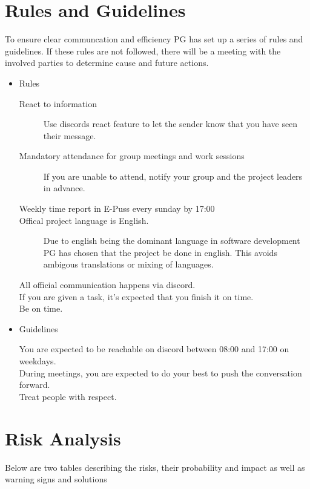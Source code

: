 \documentclass{article}
\begin{document}
\newpage
\section{Rules and Guidelines} %
    To ensure clear communcation and efficiency PG has set up a series of rules and guidelines. If these rules are not followed, there will be a meeting with the involved parties to determine cause and future actions. 
    
    \begin{itemize}
        \item Rules
            \begin{description}
                \item[React to information] Use discords react feature to let the sender know that you have seen their message. 
                \item[Mandatory attendance for group meetings and work sessions] If you are unable to attend, notify your group and the project leaders in advance. 
                \item[Weekly time report in E-Puss every sunday by 17:00]
                \item[Offical project language is English.] Due to english being the dominant language in software development PG has chosen that the project be done in english. This avoids ambigous translations or mixing of languages.
                \item[All official communication happens via discord.]
                \item[If you are given a task, it's expected that you finish it on time.]
                \item[Be on time.]
            \end{description}
        \item Guidelines
            \begin{description}
                \item[You are expected to be reachable on discord between 08:00 and 17:00 on weekdays.]
                \item[During meetings, you are expected to do your best to push the conversation forward.]
                \item[Treat people with respect.]
            \end{description}
    \end{itemize}
   
\section{Risk Analysis}
    Below are two tables describing the risks, their probability and impact as well as warning signs and solutions
    
\end{document}
